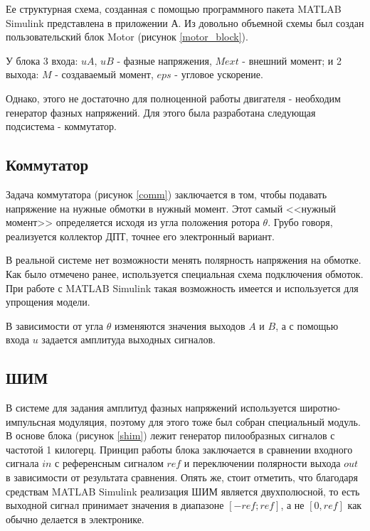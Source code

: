 Ее структурная схема, созданная с помощью программного пакета
MATLAB Simulink представлена в приложении А. %
Из довольно объемной схемы был создан пользовательский блок Motor (рисунок \ref{motor_block}).


У блока 3 входа: $uA$, $uB$ - фазные напряжения, $Mext$ - внешний момент; 
и 2 выхода: $M$ - создаваемый момент, $eps$ - угловое ускорение.

Однако, этого не достаточно для полноценной работы двигателя - необходим генератор фазных напряжений.
Для этого была разработана следующая подсистема - коммутатор.

\subsection{Коммутатор}

Задача коммутатора (рисунок \ref{comm}) заключается в том, чтобы подавать напряжение на нужные обмотки в нужный момент.
Этот самый <<нужный момент>> определяется исходя из угла положения ротора $\theta$. Грубо говоря,
реализуется коллектор ДПТ, точнее его электронный вариант.

В реальной системе нет возможности менять полярность напряжения на обмотке. Как было отмечено ранее,
используется специальная схема подключения обмоток. При работе с MATLAB Simulink такая возможность имеется и
используется для упрощения модели.


В зависимости от угла $\theta$ изменяются значения выходов $A$ и $B$, а с помощью входа $u$ задается амплитуда
выходных сигналов.


\clearpage

\subsection{ШИМ}

В системе для задания амплитуд фазных напряжений используется широтно-импульсная модуляция, 
поэтому для этого тоже был собран специальный модуль.
В основе блока (рисунок \ref{shim}) лежит генератор пилообразных сигналов с частотой 1 килогерц. 
Принцип работы блока заключается в сравнении входного сигнала $in$ с референсным сигналом
$ref$ и переключении полярности выхода $out$ в зависимости от результата сравнения. Опять же, стоит отметить, что
благодаря средствам MATLAB Simulink реализация ШИМ является двухполюсной, то есть выходной сигнал принимает
значения в диапазоне $[-ref; ref]$, а не $[0, ref]$ как обычно делается в электронике.

